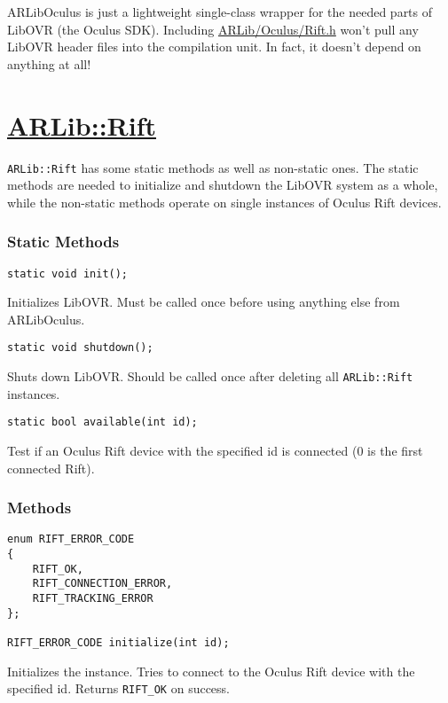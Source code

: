 ARLibOculus is just a lightweight single-class wrapper for the needed parts of LibOVR (the Oculus SDK)\cite{dk2}.
Including \href{https://github.com/ands/OculusMeetsAR/blob/master/ARLib/include/ARLib/Oculus/Rift.h}{ARLib/Oculus/Rift.h} won't pull any LibOVR header files into the compilation unit.
In fact, it doesn't depend on anything at all!

\section{\texorpdfstring{\href{https://github.com/ands/OculusMeetsAR/blob/master/ARLib/include/ARLib/Oculus/Rift.h}{ARLib::Rift}}{ARLib::Rift}}\label{arlibrift}
\texttt{ARLib::Rift} has some static methods as well as non-static ones.
The static methods are needed to initialize and shutdown the LibOVR system as a whole,
while the non-static methods operate on single instances of Oculus Rift devices.

\subsubsection{Static Methods}\label{static-methods}

\begin{lstlisting}
static void init();
\end{lstlisting}
Initializes LibOVR. Must be called once before using anything else from ARLibOculus.

\begin{lstlisting}
static void shutdown();
\end{lstlisting}
Shuts down LibOVR. Should be called once after deleting all \texttt{ARLib::Rift} instances.

\begin{lstlisting}
static bool available(int id);
\end{lstlisting}
Test if an Oculus Rift device with the specified id is connected (0 is the first connected Rift).

\subsubsection{Methods}\label{methods}

\begin{lstlisting}
enum RIFT_ERROR_CODE
{
    RIFT_OK,
    RIFT_CONNECTION_ERROR,
    RIFT_TRACKING_ERROR
};

RIFT_ERROR_CODE initialize(int id);
\end{lstlisting}
Initializes the instance. Tries to connect to the Oculus Rift device with the specified id. Returns \texttt{RIFT\_OK} on success.


